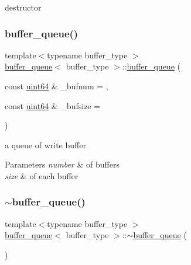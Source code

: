 destructor 

\mbox{\label{structbuffer__queue_a4e972bf42989038b6ef7eda7a372d1c3}} 
\subsubsection{\texorpdfstring{buffer\+\_\+queue()}{buffer\_queue()}\hspace{0.1cm}{\footnotesize\ttfamily [2/2]}}
{\footnotesize\ttfamily template$<$typename buffer\+\_\+type $>$ \\
\hyperlink{structbuffer__queue}{buffer\+\_\+queue}$<$ buffer\+\_\+type $>$\+::\hyperlink{structbuffer__queue}{buffer\+\_\+queue} (\begin{DoxyParamCaption}\item[{const \hyperlink{types_8h_a60e8696a4678cd348e991a1f172e53f7}{uint64} \&}]{\+\_\+bufnum = {},  }\item[{const \hyperlink{types_8h_a60e8696a4678cd348e991a1f172e53f7}{uint64} \&}]{\+\_\+bufsize = {} }\end{DoxyParamCaption})\hspace{0.3cm}{\ttfamily [inline]}}



a queue of write buffer 


\begin{DoxyParams}{Parameters}
{\em number} & of buffers \\
\hline
{\em size} & of each buffer \\
\hline
\end{DoxyParams}
\mbox{\label{structbuffer__queue_a8dda78874230bead5795e510f315dc2c}} 
\subsubsection{\texorpdfstring{$\sim$buffer\+\_\+queue()}{~buffer\_queue()}\hspace{0.1cm}{\footnotesize\ttfamily [2/2]}}
{\footnotesize\ttfamily template$<$typename buffer\+\_\+type $>$ \\
\hyperlink{structbuffer__queue}{buffer\+\_\+queue}$<$ buffer\+\_\+type $>$\+::$\sim$\hyperlink{structbuffer__queue}{buffer\+\_\+queue} (\begin{DoxyParamCaption}{ }\end{DoxyParamCaption})\hspace{0.3cm}{\ttfamily [inline]}}



